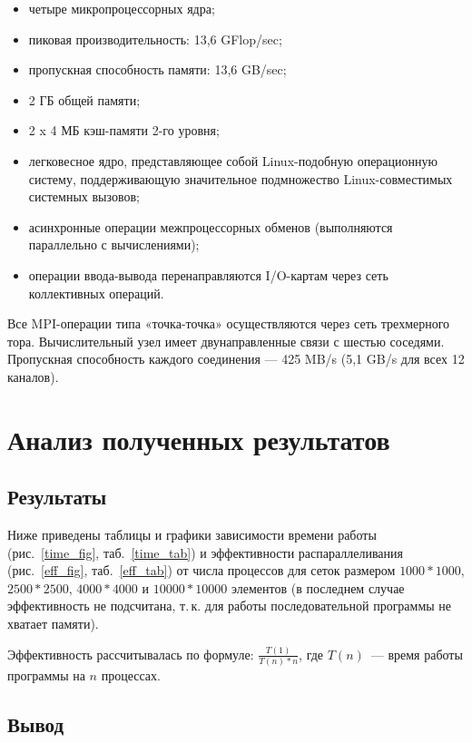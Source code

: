 \documentclass[oneside,final,14pt]{extreport}
\begin{document}
\begin{itemize}
    \item четыре микропроцессорных ядра;
    \item пиковая производительность: 13,6 GFlop/sec;
    \item пропускная способность памяти: 13,6 GB/sec;
    \item 2 ГБ общей памяти;
    \item 2 x 4 МБ кэш-памяти 2-го уровня;
    \item легковесное ядро, представляющее собой Linux-подобную операционную систему,
        поддерживающую значительное подмножество Linux-совместимых системных вызовов;
    \item асинхронные операции межпроцессорных обменов (выполняются параллельно с вычислениями);
    \item операции ввода-вывода перенаправляются I/O-картам через сеть коллективных операций.
\end{itemize}

Все MPI-операции типа «точка-точка» осуществляются через сеть трехмерного тора.
Вычислительный узел имеет двунаправленные связи с шестью соседями.
Пропускная способность каждого соединения — 425 MB/s (5,1 GB/s для всех 12
каналов).

\chapter*{Анализ полученных результатов}

\section*{Результаты}

Ниже приведены таблицы и графики зависимости времени работы (рис.~\ref{time_fig},
таб.~\ref{time_tab})
и эффективности распараллеливания (рис.~\ref{eff_fig}, таб.~\ref{eff_tab})
от числа процессов для сеток размером $1000*1000$,
$2500*2500$, $4000*4000$ и $10000*10000$ элементов (в последнем случае
эффективность не подсчитана, т.\,к. для работы последовательной программы
не хватает памяти).

Эффективность рассчитывалась по формуле: $\frac{T(1)}{T(n)*n}$,
где $T(n)$~--- время работы программы на $n$ процессах.

\section*{Вывод}
\end{document}
